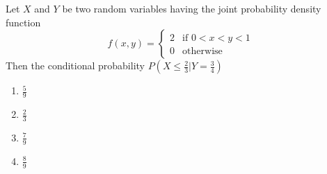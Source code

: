     \item Let $X$ and $Y$ be two random variables having the joint probability density function
    \[
    f(x,y) = \begin{cases}
        2 & \text{if } 0 < x < y < 1 \\
        0 & \text{otherwise}
    \end{cases}
    \]
    Then the conditional probability $P ( X \leq \frac{2}{3}| Y = \frac{3}{4})$
    \begin{multicols}{4}
    \begin{enumerate}
        \item $\frac{5}{9}$
        \item $\frac{2}{3}$
        \item $\frac{7}{9}$
        \item $\frac{8}{9}$
    \end{enumerate}
    \end{multicols}


